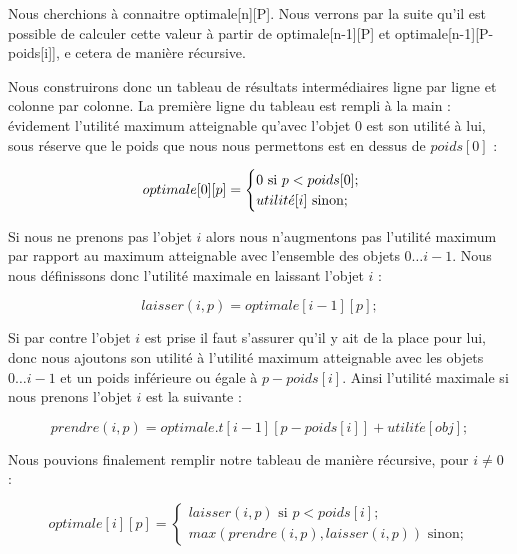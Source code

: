 Nous cherchions à connaitre optimale[n][P]. Nous verrons par la suite qu'il est possible de calculer cette valeur à partir de optimale[n-1][P] et optimale[n-1][P-poids[i]], e cetera de manière récursive.

Nous construirons donc un tableau de résultats intermédiaires ligne par ligne et colonne par colonne. La première ligne du tableau est rempli à la main : évidement l'utilité maximum atteignable qu'avec l'objet $0$ est son utilité à lui, sous réserve que le poids que nous nous permettons est en dessus de $poids[0]$ :

\begin{equation}
optimale[0][p] =
	\begin{cases}
		0 \text{ si } p < poids[0];	\\
		utilit\acute{e}[i] \text{ sinon};
	\end{cases} \\
\end{equation}

Si nous ne prenons pas l'objet $i$ alors nous n'augmentons pas l'utilité maximum par rapport au maximum atteignable avec l'ensemble des objets $0 \dots i-1$. Nous nous définissons donc l'utilité maximale en laissant l'objet $i$ :

\begin{equation}
laisser(i, p) = optimale[i-1][p];
\end{equation}

Si par contre l'objet $i$ est prise il faut s'assurer qu'il y ait de la place pour lui, donc nous ajoutons son utilité à l'utilité maximum atteignable avec les objets $0 \dots i-1$ et un poids inférieure ou égale à $p-poids[i]$. Ainsi l'utilité maximale si nous prenons l'objet $i$ est la suivante :

\begin{equation}
prendre(i, p) = optimale.t[i-1][p - poids[i]] + utilit\acute{e}[obj];
\end{equation}

Nous pouvions finalement remplir notre tableau de manière récursive, pour $i \neq 0$ :

\begin{equation}
optimale[i][p] =
	\begin{cases}
		laisser(i, p) \text{ si } p < poids[i];	\\
		max(prendre(i, p), laisser(i, p)) \text{ sinon};
	\end{cases}
\end{equation}

